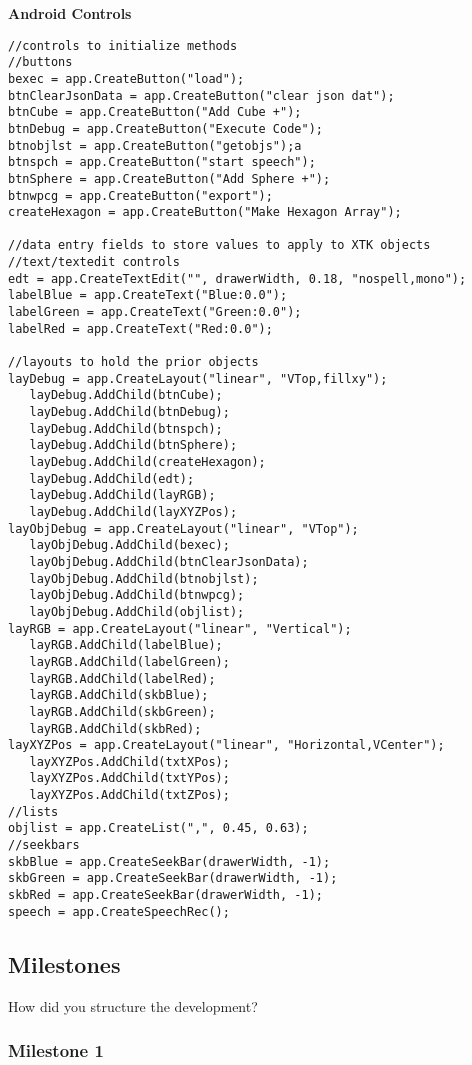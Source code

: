 \documentclass[sigconf]{acmart}
\begin{document}
\textbf{Android Controls}
\begin{verbatim}
//controls to initialize methods
//buttons
bexec = app.CreateButton("load");
btnClearJsonData = app.CreateButton("clear json dat");
btnCube = app.CreateButton("Add Cube +");
btnDebug = app.CreateButton("Execute Code");
btnobjlst = app.CreateButton("getobjs");a
btnspch = app.CreateButton("start speech");
btnSphere = app.CreateButton("Add Sphere +");
btnwpcg = app.CreateButton("export");
createHexagon = app.CreateButton("Make Hexagon Array");

//data entry fields to store values to apply to XTK objects
//text/textedit controls
edt = app.CreateTextEdit("", drawerWidth, 0.18, "nospell,mono");
labelBlue = app.CreateText("Blue:0.0");
labelGreen = app.CreateText("Green:0.0");
labelRed = app.CreateText("Red:0.0");

//layouts to hold the prior objects
layDebug = app.CreateLayout("linear", "VTop,fillxy");
   layDebug.AddChild(btnCube);
   layDebug.AddChild(btnDebug);
   layDebug.AddChild(btnspch);
   layDebug.AddChild(btnSphere);
   layDebug.AddChild(createHexagon);
   layDebug.AddChild(edt);
   layDebug.AddChild(layRGB);
   layDebug.AddChild(layXYZPos);
layObjDebug = app.CreateLayout("linear", "VTop");
   layObjDebug.AddChild(bexec);
   layObjDebug.AddChild(btnClearJsonData);
   layObjDebug.AddChild(btnobjlst);
   layObjDebug.AddChild(btnwpcg);
   layObjDebug.AddChild(objlist);
layRGB = app.CreateLayout("linear", "Vertical");
   layRGB.AddChild(labelBlue);
   layRGB.AddChild(labelGreen);
   layRGB.AddChild(labelRed);
   layRGB.AddChild(skbBlue);
   layRGB.AddChild(skbGreen);
   layRGB.AddChild(skbRed);
layXYZPos = app.CreateLayout("linear", "Horizontal,VCenter");
   layXYZPos.AddChild(txtXPos);
   layXYZPos.AddChild(txtYPos);
   layXYZPos.AddChild(txtZPos);
//lists
objlist = app.CreateList(",", 0.45, 0.63);
//seekbars
skbBlue = app.CreateSeekBar(drawerWidth, -1);
skbGreen = app.CreateSeekBar(drawerWidth, -1);
skbRed = app.CreateSeekBar(drawerWidth, -1);
speech = app.CreateSpeechRec();

\end{verbatim}
\subsection{Milestones}

How did you structure the development?

\subsubsection{Milestone 1}
\end{document}
